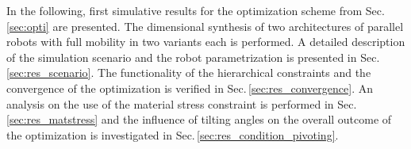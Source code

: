 \documentclass[fleqn,a4paper,10pt]{article}
\begin{document}
\begin{multicols}{2}

In the following, first simulative results for the optimization scheme from Sec.\,\ref{sec:opti} are presented.
The dimensional synthesis of two architectures of parallel robots with full mobility in two variants each is performed.
A detailed description of the simulation scenario and the robot parametrization is presented in Sec.\,\ref{sec:res_scenario}.
The functionality of the hierarchical constraints and the convergence of the optimization is verified in Sec.\,\ref{sec:res_convergence}.
An analysis on the use of the material stress constraint is performed in Sec.\,\ref{sec:res_matstress} and the influence of tilting angles on the overall outcome of the optimization is investigated in Sec.\,\ref{sec:res_condition_pivoting}.




\end{multicols}
\end{document}
